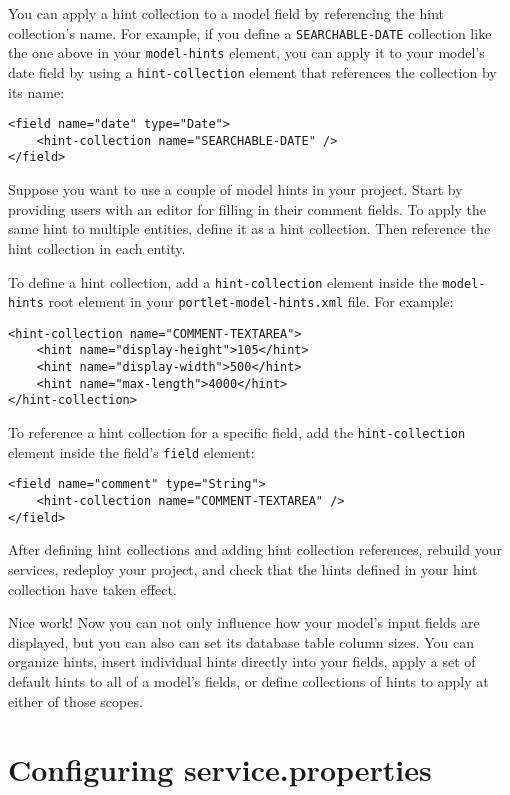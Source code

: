 You can apply a hint collection to a model field by referencing the hint
collection's name. For example, if you define a \texttt{SEARCHABLE-DATE}
collection like the one above in your \texttt{model-hints} element, you
can apply it to your model's date field by using a
\texttt{hint-collection} element that references the collection by its
name:

\begin{verbatim}
<field name="date" type="Date">
    <hint-collection name="SEARCHABLE-DATE" />
</field>
\end{verbatim}

Suppose you want to use a couple of model hints in your project. Start
by providing users with an editor for filling in their comment fields.
To apply the same hint to multiple entities, define it as a hint
collection. Then reference the hint collection in each entity.

To define a hint collection, add a \texttt{hint-collection} element
inside the \texttt{model-hints} root element in your
\texttt{portlet-model-hints.xml} file. For example:

\begin{verbatim}
<hint-collection name="COMMENT-TEXTAREA">
    <hint name="display-height">105</hint>
    <hint name="display-width">500</hint>
    <hint name="max-length">4000</hint>
</hint-collection>
\end{verbatim}

To reference a hint collection for a specific field, add the
\texttt{hint-collection} element inside the field's \texttt{field}
element:

\begin{verbatim}
<field name="comment" type="String">
    <hint-collection name="COMMENT-TEXTAREA" />
</field>
\end{verbatim}

After defining hint collections and adding hint collection references,
rebuild your services, redeploy your project, and check that the hints
defined in your hint collection have taken effect.

Nice work! Now you can not only influence how your model's input fields
are displayed, but you can also can set its database table column sizes.
You can organize hints, insert individual hints directly into your
fields, apply a set of default hints to all of a model's fields, or
define collections of hints to apply at either of those scopes.

\chapter{Configuring
service.properties}\label{configuring-service.properties}


